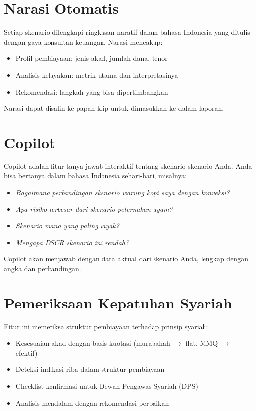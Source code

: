\documentclass[12pt,a4paper,twoside]{report}
\begin{document}
\section{Narasi Otomatis}

Setiap skenario dilengkapi ringkasan naratif dalam bahasa Indonesia yang ditulis dengan gaya konsultan keuangan. Narasi mencakup:
\begin{itemize}
  \item Profil pembiayaan: jenis akad, jumlah dana, tenor
  \item Analisis kelayakan: metrik utama dan interpretasinya
  \item Rekomendasi: langkah yang bisa dipertimbangkan
\end{itemize}

Narasi dapat disalin ke papan klip untuk dimasukkan ke dalam laporan.

\section{Copilot}

Copilot adalah fitur tanya-jawab interaktif tentang skenario-skenario Anda. Anda bisa bertanya dalam bahasa Indonesia sehari-hari, misalnya:

\begin{itemize}
  \item \emph{Bagaimana perbandingan skenario warung kopi saya dengan konveksi?}
  \item \emph{Apa risiko terbesar dari skenario peternakan ayam?}
  \item \emph{Skenario mana yang paling layak?}
  \item \emph{Mengapa DSCR skenario ini rendah?}
\end{itemize}

Copilot akan menjawab dengan data aktual dari skenario Anda, lengkap dengan angka dan perbandingan.

\section{Pemeriksaan Kepatuhan Syariah}

Fitur ini memeriksa struktur pembiayaan terhadap prinsip syariah:
\begin{itemize}
  \item Kesesuaian akad dengan basis kuotasi (murabahah $\to$ flat, MMQ $\to$ efektif)
  \item Deteksi indikasi riba dalam struktur pembiayaan
  \item Checklist konfirmasi untuk Dewan Pengawas Syariah (DPS)
  \item Analisis mendalam dengan rekomendasi perbaikan
\end{itemize}
\end{document}
